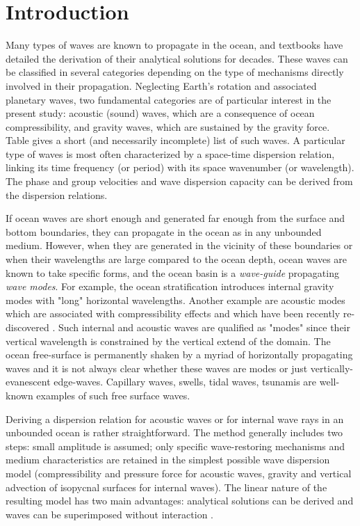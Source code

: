 \documentclass[a4paper,11pt]{article}
\begin{document}
\section{Introduction}
Many types of waves are known to propagate in the ocean, and textbooks \citep{LeBlond_Mysak_1981, gill_1982, Pedlosky_1982} have detailed the derivation of their analytical solutions for decades. These waves can be classified in several categories depending on the type of mechanisms directly involved in their propagation. Neglecting Earth's rotation and associated planetary waves, two fundamental categories are of particular interest in the present study: acoustic (sound) waves, which are a consequence of ocean compressibility, and gravity waves, which are sustained by the gravity force. Table  gives a short (and necessarily incomplete) list of such waves. A particular type of waves is most often characterized by a space-time dispersion relation, linking its time frequency (or period) with its space wavenumber (or wavelength). The phase and group velocities and wave dispersion capacity can be derived from the dispersion relations.

If ocean waves are short enough and generated far enough from the surface and bottom boundaries, they can propagate in the ocean as in any unbounded medium. However, when they are generated in the vicinity of these boundaries or when their wavelengths are large compared to the ocean depth, ocean waves are known to take specific forms, and the ocean basin is a \textit{wave-guide} propagating \textit{wave modes}. For example, the ocean stratification introduces internal gravity modes with "long" horizontal wavelengths. Another example are acoustic modes which are associated with compressibility effects and which have been recently re-discovered \citep{smith_2015}. Such internal and acoustic waves are qualified as "modes" since their vertical wavelength is constrained by the vertical extend of the domain. The ocean free-surface is permanently shaken by a myriad of horizontally propagating waves and it is not always clear whether these waves are modes or just vertically-evanescent edge-waves. Capillary waves, swells, tidal waves, tsunamis are well-known examples of such free surface waves.

Deriving a dispersion relation for acoustic waves or for internal wave rays in an unbounded ocean is rather straightforward. The method generally includes two steps: small amplitude is assumed; only specific wave-restoring mechanisms and medium characteristics are retained in the simplest possible wave dispersion model (compressibility and pressure force for acoustic waves, gravity and vertical advection of isopycnal surfaces for internal waves). The linear nature of the resulting model has two main advantages: analytical solutions can be derived and waves can be superimposed without interaction \citep{lighthill_1967}.
\end{document}
